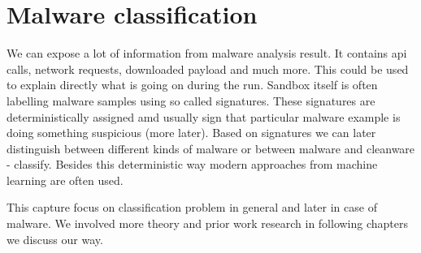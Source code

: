 \chapter{Malware classification}
We can expose a lot of information from malware analysis result. It contains api calls, network requests, downloaded payload and much more. This could be used to explain directly what is going on during the run. Sandbox itself is often labelling malware samples using so called signatures. These signatures are deterministically assigned amd usually sign that particular malware example is doing something suspicious (more later). Based on signatures we can later distinguish between different kinds of malware or between malware and cleanware - classify. Besides this deterministic way modern approaches from machine learning are often used.

This capture focus on classification problem in general and later in case of malware. We involved more theory and prior work research in following chapters we discuss our way.


